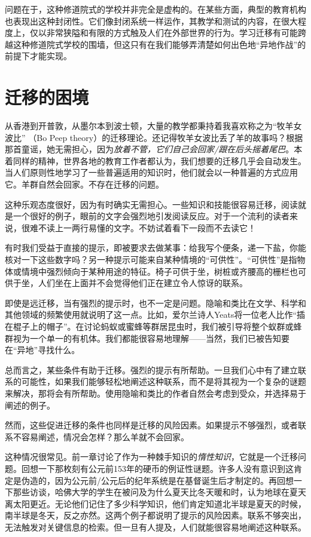 问题在于，这种修道院式的学校并非完全是虚构的。在某些方面，典型的教育机构也表现出这种封闭性。它们像封闭系统一样运作，其教学和测试的内容，在很大程度上，仅以非常狭隘和有限的方式触及人们在外部世界的行为。学习迁移有可能跨越这种修道院式学校的围墙，但这只有在我们能够弄清楚如何出色地“异地作战”的前提下才能实现。

\section*{迁移的困境}

从香港到开普敦，从墨尔本到波士顿，大量的教学都秉持着我喜欢称之为“牧羊女波比” （Bo Peep theory）的迁移理论。还记得牧羊女波比丢了羊的故事吗？根据那首童谣，她无需担心，因为\textit{放着不管，它们自己会回家/跟在后头摇着尾巴}。本着同样的精神，世界各地的教育工作者都认为，我们想要的迁移几乎会自动发生。当人们原则性地学习了一些普遍适用的知识时，他们就会以一种普遍的方式应用它。羊群自然会回家。不存在迁移的问题。

这种乐观态度很好，因为有时确实无需担心。一些知识和技能很容易迁移，阅读就是一个很好的例子，眼前的文字会强烈地引发阅读反应。对于一个流利的读者来说，很难不读上一两行易懂的文字。不妨试着看下一段而不去读它！

有时我们受益于直接的提示，即被要求去做某事：给我写个便条，递一下盐，你能核对一下这些数字吗？另一种提示可能来自某种情境的“可供性”。“可供性”是指物体或情境中强烈倾向于某种用途的特征。椅子可供于坐，树桩或齐腰高的栅栏也可供于坐，人们坐在上面并不会觉得他们正在建立令人惊讶的联系。

即使是远迁移，当有强烈的提示时，也不一定是问题。隐喻和类比在文学、科学和其他领域的频繁使用就说明了这一点。比如，爱尔兰诗人Yeats将一位老人比作“插在棍子上的帽子”。在讨论蚂蚁或蜜蜂等群居昆虫时，我们被引导将整个蚁群或蜂群视为一个单一的有机体。我们都能很容易地理解——当然，我们已被告知要在“异地”寻找什么。

总而言之，某些条件有助于迁移。强烈的提示有所帮助。一旦我们心中有了建立联系的可能性，如果我们能够轻松地阐述这种联系，而不是将其视为一个复杂的谜题来解决，那将会有所帮助。使用隐喻和类比的作者自然会考虑到受众，并选择易于阐述的例子。

然而，这些促进迁移的条件也同样是迁移的风险因素。如果提示不够强烈，或者联系不容易阐述，情况会怎样？那么羊就不会回家。

这种情况很常见。前一章讨论了作为一种棘手知识的\textit{惰性知识}，它就是一个迁移问题。回想一下那枚刻有公元前153年的硬币的例证性谜题。许多人没有意识到这肯定是伪造的，因为公元前/公元后的纪年系统是在基督诞生后才制定的。再回想一下那些访谈，哈佛大学的学生在被问及为什么夏天比冬天暖和时，认为地球在夏天离太阳更近。无论他们记住了多少科学知识，他们肯定知道北半球是夏天的时候，南半球是冬天，反之亦然。这两个例子都说明了提示的风险因素。联系不够突出，无法触发对关键信息的检索。但一旦有人提及，人们就能很容易地阐述这种联系。

